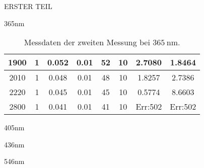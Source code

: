 \begin{appendix}
\begin{chapter}{ERSTER TEIL}
\begin{section}{365nm}
\begin{table}[htbp]
\begin{tabular}{|c|c|c|c|c|c|c|c|}
            1900 & 1 & 0.052 & 0.01 & 52 & 10 & 2.7080 & 1.8464 \\ \hline
            2010 & 1 & 0.048 & 0.01 & 48 & 10 & 1.8257 & 2.7386 \\ \hline
            2220 & 1 & 0.045 & 0.01 & 45 & 10 & 0.5774 & 8.6603 \\ \hline
            2800 & 1 & 0.041 & 0.01 & 41 & 10 & Err:502 & Err:502 \\ \hline
          \end{tabular}
          \caption{Messdaten der zweiten Messung bei $\SI{365}{\nano\meter}$.}
          \label{tab:365_2}
        \end{table}
        
      \end{section}
      
     
     
      \begin{section}{405nm}
        \label{Anhang:chp:ERSTERTEIL:sec:405}
      
      
      
      \end{section}
      
     
     
      \begin{section}{436nm}
        \label{Anhang:chp:ERSTERTEIL:sec:436}
      
      
      
      \end{section}
      
     
     
      \begin{section}{546nm}
        \label{Anhang:chp:ERSTERTEIL:sec:546}
      
      
      
      \end{section}
      
     
     

\end{chapter}
\end{appendix}
